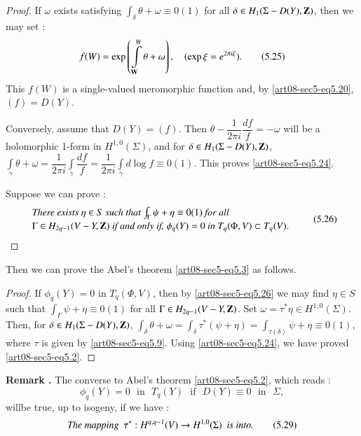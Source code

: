 \begin{proof}
If $\omega$ exists satisfying $\int_{\delta}\theta+\omega\equiv 0(1)$ for all $\delta\in H_{1}(\Sigma-D(Y),\mathbf{Z})$, then we may set :
\begin{equation*}
f(W)=\exp \left(\int\limits^{W}_{\mathbf{W}}\theta+\omega\right),\quad (\exp \xi=e^{2\pi i\xi}).\tag{5.25}\label{art08-sec5-eq5.25}
\end{equation*}
This $f(W)$ is a single-valued meromorphic function and, by \eqref{art08-sec5-eq5.20}, $(f)=D(Y)$.

Conversely, assume that $D(Y)=(f)$. Then $\theta-\dfrac{1}{2\pi i}\dfrac{df}{f}=-\omega$ will be a holomorphic 1-form in $H^{1,0}(\Sigma)$, and for $\delta\in H_{1}(\Sigma-D(Y),\mathbf{Z})$, $\int\limits_{\gamma}\theta+\omega=\dfrac{1}{2\pi i}\int\limits_{\gamma}\dfrac{df}{f}=\dfrac{1}{2\pi i}\int\limits_{\gamma}d\log f\equiv 0(1)$. This proves \eqref{art08-sec5-eq5.24}.

Suppose we can prove :
\begin{equation*}
\begin{array}{l}
\text{\em There exists $\eta\in S$ such that $\int_{\Gamma}\psi+\eta\equiv 0(1)$ for all}\\[2pt]
\Gamma\in H_{2q-1}(V-Y,\mathbf{Z})\text{~\em if and only if,~}\phi_{q}(Y)=0\text{~\em in~} T_{q}(\Phi,V)\subset T_{q}(V).
\end{array}\tag{5.26}\label{art08-sec5-eq5.26}
\end{equation*}
\end{proof}

Then we can prove the Abel's theorem \eqref{art08-sec5-eq5.3} as follows.

\begin{proof}
If $\phi_{q}(Y)=0$ in $T_{q}(\Phi,V)$, then by \eqref{art08-sec5-eq5.26} we may find $\eta\in S$ such that $\int_{\Gamma}\psi+\eta\equiv 0(1)$ for all $\Gamma\in H_{2q-1}(V-Y,\mathbf{Z})$. Set $\omega=\tau^{*}\eta\in H^{1,0}(\Sigma)$. Then, for $\delta\in H_{1}(\Sigma-D(Y),\mathbf{Z})$, $\int_{\delta}\theta+\omega=\int_{\delta}\tau^{*}(\psi+\eta)=\int_{\tau(\delta)}\psi+\eta\equiv 0(1)$, where $\tau$ is given by \eqref{art08-sec5-eq5.9}. Using \eqref{art08-sec5-eq5.24}, we have proved \eqref{art08-sec5-eq5.2}.
\end{proof}

\medskip
\noindent
{\bf Remark .\label{art08-sec5-rem5.27}}
The converse to Abel's theorem \eqref{art08-sec5-eq5.2}, which reads :
\begin{equation*}
\phi_{q}(Y)=0\text{~ in~ } T_{q}(Y)\text{~ if~ } D(Y)\equiv 0\text{~ in~ }\Sigma,\tag{5.28}\label{art08-sec5-eq5.28}
\end{equation*}
will\pageoriginale be true, up to isogeny, if we have :
\begin{equation*}
\text{\em The mapping~ } \tau^{*}:H^{q,q-1}(V)\to H^{1,0}(\Sigma)\text{~ \em is into.}\tag{5.29}\label{art08-sec5-eq5.29}
\end{equation*}

